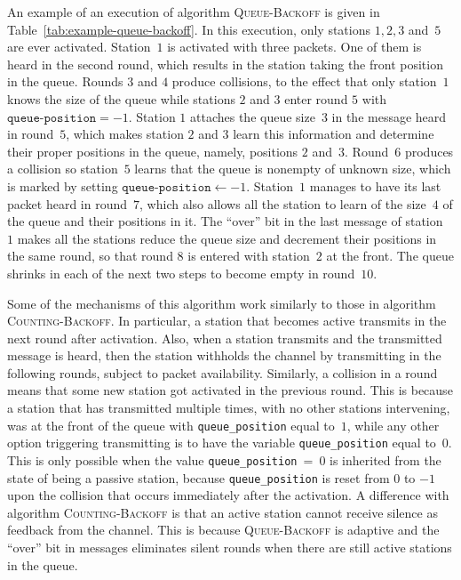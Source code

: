 \documentclass[11pt]{article}
\begin{document}
An example of an execution of algorithm \textsc{Queue-Backoff} is given in Table~\ref{tab:example-queue-backoff}.
In this execution, only stations $1,2,3$ and~$5$ are ever activated.
Station~$1$ is activated with three packets.
One of them is heard in the second round, which results in the station taking the front position in the queue.
Rounds $3$ and $4$ produce collisions, to the effect that only station~$1$ knows the size of the queue while stations $2$ and $3$ enter round $5$ with $\texttt{queue-position}=-1$.
Station $1$ attaches the queue size~$3$ in the message heard in round~$5$, which makes station $2$ and $3$ learn this information and determine their proper positions in the queue, namely, positions $2$ and~$3$.
Round~$6$ produces a collision so station~$5$ learns that the queue is nonempty of unknown size, which is marked by setting $\texttt{queue-position}\gets -1$.
Station~$1$ manages to have its last packet heard in round~$7$, which also allows all the station to learn of the size~$4$ of the queue and their positions in it.
The ``over'' bit in the last message of station~$1$ makes all the stations reduce the queue size and decrement their positions in the same round, so that round $8$ is entered with station~$2$ at the front.
The queue shrinks in each of the next two steps to become empty in round~$10$.

Some of the mechanisms of this algorithm work similarly to those in algorithm \textsc{Counting-Backoff}.
In particular, a station that becomes active transmits in the next round after activation. 
Also, when a station transmits and the transmitted message is heard, then the station withholds the channel by transmitting in the following rounds, subject to packet availability. 
Similarly, a collision in a round means that some new station got activated in the previous round. 
This is because a station that has transmitted multiple times, with no other stations intervening, was at the front of the queue with \texttt{queue\_position} equal to~$1$, while any other option triggering transmitting is to have the variable \texttt{queue\_position}  equal to~$0$.
This is only possible when the value \texttt{queue\_position}~=~$0$ is inherited from the state of being a passive station, because \texttt{queue\_position} is reset from $0$ to $-1$ upon the collision that occurs immediately after the activation.
A difference with algorithm \textsc{Counting-Backoff} is that an active station cannot receive silence as feedback from the channel.
This is because \textsc{Queue-Backoff} is adaptive and the ``over'' bit in messages eliminates silent rounds when there are still active stations in the queue.
\end{document}
